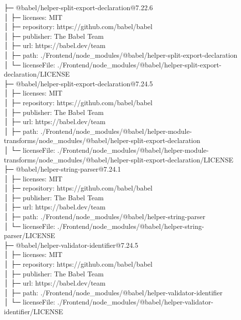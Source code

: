 ├─ @babel/helper-split-export-declaration@7.22.6\\
│  ├─ licenses: MIT\\
│  ├─ repository: https://github.com/babel/babel\\
│  ├─ publisher: The Babel Team\\
│  ├─ url: https://babel.dev/team\\
│  ├─ path: ./Frontend/node\_modules/@babel/helper-split-export-declaration\\
│  └─ licenseFile: ./Frontend/node\_modules/@babel/helper-split-export-declaration/LICENSE\\
├─ @babel/helper-split-export-declaration@7.24.5\\
│  ├─ licenses: MIT\\
│  ├─ repository: https://github.com/babel/babel\\
│  ├─ publisher: The Babel Team\\
│  ├─ url: https://babel.dev/team\\
│  ├─ path: ./Frontend/node\_modules/@babel/helper-module-transforms/node\_modules/@babel/helper-split-export-declaration\\
│  └─ licenseFile: ./Frontend/node\_modules/@babel/helper-module-transforms/node\_modules/@babel/helper-split-export-declaration/LICENSE\\
├─ @babel/helper-string-parser@7.24.1\\
│  ├─ licenses: MIT\\
│  ├─ repository: https://github.com/babel/babel\\
│  ├─ publisher: The Babel Team\\
│  ├─ url: https://babel.dev/team\\
│  ├─ path: ./Frontend/node\_modules/@babel/helper-string-parser\\
│  └─ licenseFile: ./Frontend/node\_modules/@babel/helper-string-parser/LICENSE\\
├─ @babel/helper-validator-identifier@7.24.5\\
│  ├─ licenses: MIT\\
│  ├─ repository: https://github.com/babel/babel\\
│  ├─ publisher: The Babel Team\\
│  ├─ url: https://babel.dev/team\\
│  ├─ path: ./Frontend/node\_modules/@babel/helper-validator-identifier\\
│  └─ licenseFile: ./Frontend/node\_modules/@babel/helper-validator-identifier/LICENSE\\
